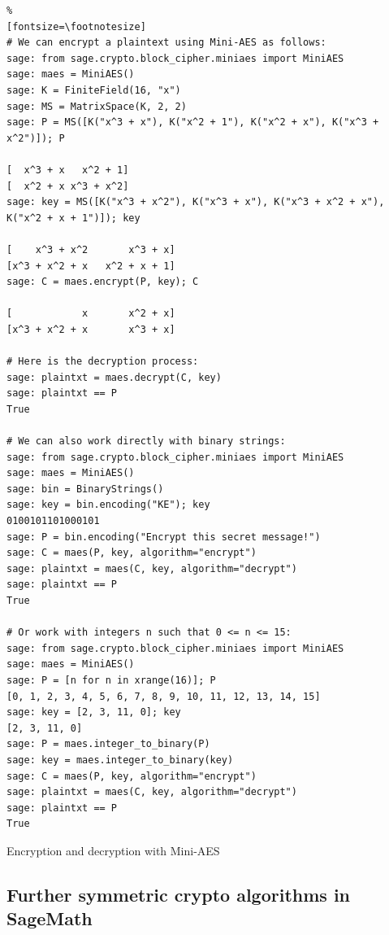 \begin{sagecode}
\begin{Verbatim}%
[fontsize=\footnotesize]
# We can encrypt a plaintext using Mini-AES as follows:
sage: from sage.crypto.block_cipher.miniaes import MiniAES
sage: maes = MiniAES()
sage: K = FiniteField(16, "x")
sage: MS = MatrixSpace(K, 2, 2)
sage: P = MS([K("x^3 + x"), K("x^2 + 1"), K("x^2 + x"), K("x^3 + x^2")]); P

[  x^3 + x   x^2 + 1]
[  x^2 + x x^3 + x^2]
sage: key = MS([K("x^3 + x^2"), K("x^3 + x"), K("x^3 + x^2 + x"), K("x^2 + x + 1")]); key

[    x^3 + x^2       x^3 + x]
[x^3 + x^2 + x   x^2 + x + 1]
sage: C = maes.encrypt(P, key); C

[            x       x^2 + x]
[x^3 + x^2 + x       x^3 + x]

# Here is the decryption process:
sage: plaintxt = maes.decrypt(C, key)
sage: plaintxt == P
True

# We can also work directly with binary strings:
sage: from sage.crypto.block_cipher.miniaes import MiniAES
sage: maes = MiniAES()
sage: bin = BinaryStrings()
sage: key = bin.encoding("KE"); key
0100101101000101
sage: P = bin.encoding("Encrypt this secret message!")
sage: C = maes(P, key, algorithm="encrypt")
sage: plaintxt = maes(C, key, algorithm="decrypt")
sage: plaintxt == P
True

# Or work with integers n such that 0 <= n <= 15:
sage: from sage.crypto.block_cipher.miniaes import MiniAES
sage: maes = MiniAES()
sage: P = [n for n in xrange(16)]; P
[0, 1, 2, 3, 4, 5, 6, 7, 8, 9, 10, 11, 12, 13, 14, 15]
sage: key = [2, 3, 11, 0]; key
[2, 3, 11, 0]
sage: P = maes.integer_to_binary(P)
sage: key = maes.integer_to_binary(key)
sage: C = maes(P, key, algorithm="encrypt")
sage: plaintxt = maes(C, key, algorithm="decrypt")
sage: plaintxt == P
True
\end{Verbatim}
\caption{Encryption and decryption with Mini-AES}
\label{cryptomethods:Mini-AES:Sage_example}
\end{sagecode}



\subsection{Further symmetric crypto algorithms in SageMath}
\label{CM_Sage_SymCryptoAlg}

